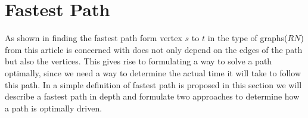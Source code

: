 \section{Fastest Path}
As shown in  finding the fastest path form vertex $s$ to $t$ in the type of graphs($RN$) from  this article is concerned with does not only depend on the edges of the path but also the vertices. This gives rise to formulating a way to solve a path optimally, since we need a way to determine the actual time it will take to follow this path. In  a simple definition of fastest path is proposed in this section we will describe a fastest path in depth and formulate two approaches to determine how a path is optimally driven.  
    

